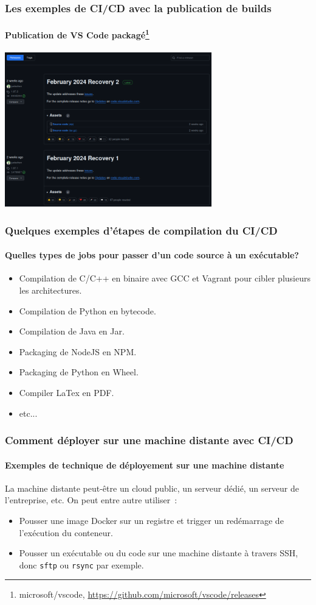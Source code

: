 \documentclass{beamer}
\begin{document}
    \begin{frame}
        \frametitle{Les exemples de CI/CD avec la publication de builds}
        \framesubtitle{Publication de VS Code packagé\footnote{microsoft/vscode, \url{https://github.com/microsoft/vscode/releases}}}
        \transdissolve
        \centering
        \includegraphics[width=9cm]{image/vs-code-release.png}
    \end{frame}

    \begin{frame}
        \frametitle{Quelques exemples d'étapes de compilation du CI/CD}
        \framesubtitle{Quelles types de jobs pour passer d'un code source à un exécutable?}
        \transdissolve
        \pause
        \begin{itemize}
            \item Compilation de C/C++ en binaire avec GCC et Vagrant pour cibler plusieurs les architectures.
            \item Compilation de Python en bytecode.
            \item Compilation de Java en Jar.
            \item Packaging de NodeJS en NPM.
            \item Packaging de Python en Wheel.
            \item Compiler LaTex en PDF.
            \item etc...
        \end{itemize}
    \end{frame}

    \begin{frame}
        \frametitle{Comment déployer sur une machine distante avec CI/CD}
        \framesubtitle{Exemples de technique de déployement sur une machine distante}
        \transdissolve
        La machine distante peut-être un cloud public, un serveur dédié, un serveur de l'entreprise, etc.
        \bigbreak
        On peut entre autre utiliser~:
        \begin{itemize}
            \item Pousser une image Docker sur un registre et trigger un redémarrage de l'exécution du conteneur.
            \item Pousser un exécutable ou du code sur une machine distante à travers SSH, donc \lstinline{sftp} ou \lstinline{rsync} par exemple.
        \end{itemize}
    \end{frame}
\end{document}
